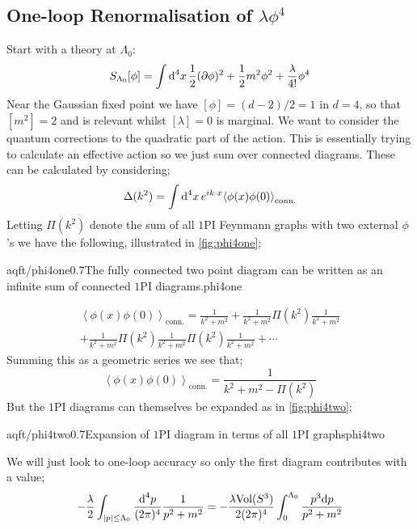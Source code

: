 \subsection{One-loop Renormalisation of $\lambda \phi^4$}
Start with a theory at $\Lambda_0$:
\begin{equation*}
S_{\Lambda_0}[\phi] = \int{\text{d}^4 x \,\frac{1}{2}(\partial\phi)^2 + \frac{1}{2}m^2 \phi^2 + \frac{\lambda}{4!}\phi^4}
\end{equation*}
Near the Gaussian fixed point we have $[\phi] = (d - 2)/2 = 1$ in $d = 4$, so that $[m^2] = 2$ and is relevant whilst $[\lambda] = 0$ is marginal. We want to consider the quantum corrections to the quadratic part of the action. This is essentially trying to calculate an effective action so we just sum over connected diagrams. These can be calculated by considering;
\begin{equation*}
\Delta(k^2) = \int{\upd{^4 x} e^{ik\cdot x}\left< \phi(x)\phi(0) \right>_{\text{conn.}}}
\end{equation*}
Letting $\Pi(k^2)$ denote the sum of all $1$PI Feynmann graphs with two external $\phi$'s we have the following, illustrated in \autoref{fig:phi4one};
\begin{mygraphic}{aqft/phi4one}{0.7}{The fully connected two point diagram can be written as an infinite sum of connected $1$PI diagrams.}{phi4one}\end{mygraphic}
\begin{multline*}
\left< \phi(x)\phi(0) \right>_{\text{conn.}} = \frac{1}{k^2 + m^2} + \frac{1}{k^2 + m^2}\Pi(k^2)\frac{1}{k^2 + m^2} \\ + \frac{1}{k^2 + m^2}\Pi(k^2)\frac{1}{k^2 + m^2}\Pi(k^2)\frac{1}{k^2 + m^2} + \cdots
\end{multline*}
Summing this as a geometric series we see that;
\begin{equation}
\left< \phi(x)\phi(0) \right>_{\text{conn.}} = \frac{1}{k^2 + m^2 - \Pi(k^2)}
\end{equation}
But the $1$PI diagrams can themselves be expanded as in \autoref{fig:phi4two};
\begin{mygraphic}{aqft/phi4two}{0.7}{Expansion of $1$PI diagram in terms of all $1$PI graphs}{phi4two}\end{mygraphic}
We will just look to one-loop accuracy so only the first diagram contributes with a value;
\begin{equation}
-\frac{\lambda}{2}\int_{\abs{p}\leq\Lambda_0}{\frac{\ud^4 p}{(2\pi)^4}\frac{1}{p^2 + m^2}} = -\frac{\lambda \text{Vol}(S^{3})}{2(2\pi)^4}\int_0^{\Lambda_0}{\frac{p^3 \ud p}{p^2 + m^2}}
\end{equation}
